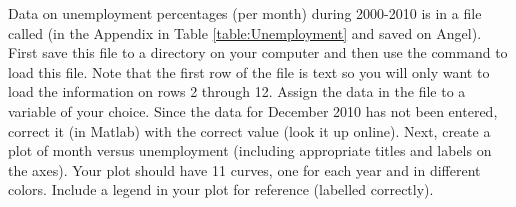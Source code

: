 {Data on unemployment percentages (per month) during 2000-2010 is in a file called  (in the Appendix in Table \ref{table:Unemployment} and saved on Angel).  First save this file to a directory on your computer and then use the command  to load this file.  Note that the first row of the file is text so you will only want to load the information on rows 2 through 12.  Assign the data in the file to a variable of your choice.  Since the data for December 2010 has not been entered, correct it (in Matlab) with the correct value (look it up online).  Next, create a plot of month versus unemployment (including appropriate titles and labels on the axes).  Your plot should have 11 curves, one for each year and in different colors.  Include a legend in your plot for reference (labelled correctly).}
{}